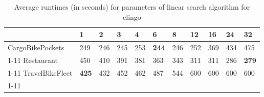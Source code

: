 \begin{table}[ht]
\centering
\caption{Average runtimes (in seconds) for  parameters of linear search algorithm for clingo}
\label{tab:results:linear}
\begin{tabular}{l|llllllllll}
\toprule
 & 1 & 2 & 3 & 4 & 6 & 8 & 12 & 16 & 24 & 32 \\
\midrule
CargoBikePockets & 249 & 246 & 245 & 253 & \textbf{244} & 246 & 252 & 369 & 434 & 475 \\
\cline{1-11}
Restaurant & 450 & 410 & 391 & 381 & 363 & 343 & 311 & 311 & 286 & \textbf{279} \\
\cline{1-11}
TravelBikeFleet & \textbf{425} & 432 & 452 & 462 & 487 & 544 & 600 & 600 & 600 & 600 \\
\cline{1-11}
\bottomrule
\end{tabular}
\end{table}

